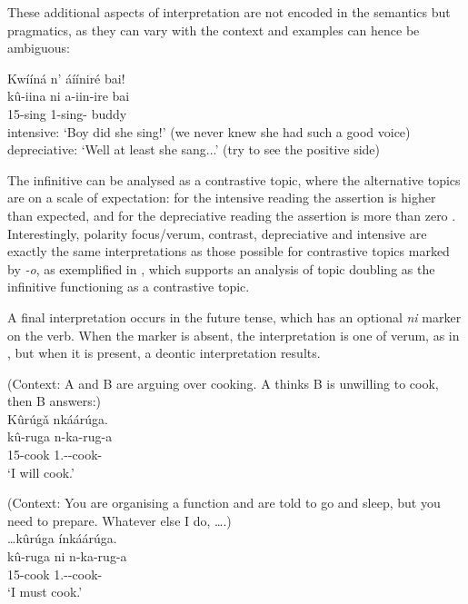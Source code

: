 \documentclass[output=paper]{langscibook}
\begin{document}
\z

These additional aspects of interpretation are not encoded in the semantics but pragmatics, as they can vary with the context and examples can hence be ambiguous:

\ea
Kwííná n’ áííniré bai!\\
\gll
kû-iina  ni  a-iin-ire  bai\\
15-sing \FOC{} 1\SM{}-sing-\PFV{} buddy\\
\glt
intensive: ‘Boy did she sing!’ (we never knew she had such a good voice)
depreciative: ‘Well at least she sang...’ (try to see the positive side)

\z

The infinitive can be analysed as a contrastive topic, where the alternative topics are on a scale of expectation: for the intensive reading the assertion is higher than expected, and for the depreciative reading the assertion is more than zero \citep[see][]{JerrovanderWalFut}. Interestingly, polarity focus/verum, contrast, depreciative and intensive are exactly the same interpretations as those possible for contrastive topics marked by \textit{-o}, as exemplified in , which supports an analysis of topic doubling as the infinitive functioning as a contrastive topic.

A final interpretation occurs in the future tense, which has an optional \textit{ni} marker on the verb. When the marker is absent, the interpretation is one of verum, as in , but when it is present, a deontic interpretation results.

\ea
\label{bkm:Ref132100667}
(Context: A and B are arguing over cooking. A thinks B is unwilling to cook, then B answers:)\\
Kûrúgǎ nkáárúga.\\
\gll
kû-ruga  n-ka-rug-a\\
15-cook 1\SG.\SM-\FUT{}-cook-\FV{}\\
\glt
‘I will cook.’

\z

\ea
(Context: You are organising a function and are told to go and sleep, but you need to prepare. Whatever else I do, ….)\\
…kûrúga ínkáárúga.\\
\gll
kû-ruga  ni  n-ka-rug-a\\
15-cook \FOC{} 1\SG.\SM{}-\FUT{}-cook-\FV{} \\
\glt
‘I must cook.’
\end{document}
